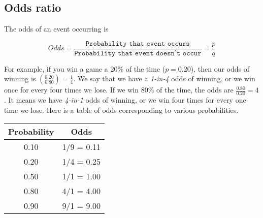 \documentclass[11pt]{book}\usepackage[]{graphicx}\usepackage[]{color}
\begin{document}
% 
% 
% 
% 

\subsection{Odds ratio}

The odds of an event occurring is

\begin{equation*}
  Odds = \frac{ \texttt{Probability that event occurs}}{\texttt{Probability that event doesn't occur}} = \frac{p}{q}
\end{equation*}

For example, if you win a game a 20\% of the time ($p = 0.20$), then our odds of winning is $( \frac{0.20}{0.80}) = \frac{1}{4}$.  We say that we have a \textit{1-in-4} odds of winning, or we win once for every four times we lose.  If we win 80\% of the time, the odds are $\frac{0.80}{0.20} = 4$. It means we have \textit{4-in-1} odds of winning, or we win four times for every one time we lose.  Here is a table of odds corresponding to various probabilities.

\begin{table}[ht]
\centering
\begin{tabular}{@{} cc @{}} \hline
Probability & Odds \\ \hline
0.10 & 1/9 = 0.11 \\
0.20 & 1/4 = 0.25 \\
0.50 & 1/1 = 1.00 \\
0.80 & 4/1 = 4.00 \\
0.90 & 9/1 = 9.00 \\ \hline
\end{tabular}
\end{table}
\end{document}
